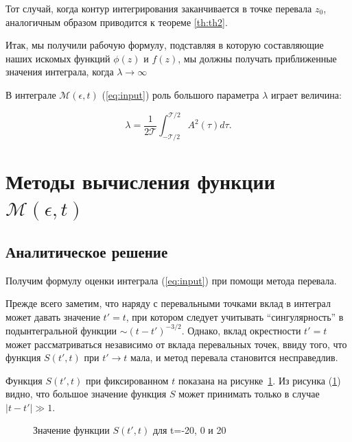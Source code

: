 \documentclass[14pt, a4paper]{article}
\numberwithin{figure}{section}
\numberwithin{equation}{section}
\newcommand{\sectionbreak}{\clearpage}
\newcommand{\cM}{\mathcal{M}}
\newcommand{\cT}{\mathcal{T}}
\begin{document}
Тот случай, когда контур интегрирования заканчивается в точке перевала $z_0$, аналогичным образом приводится к теореме \ref{th:th2}.

Итак, мы получили рабочую формулу, подставляя в которую составляющие наших искомых функций $\phi (z)$ и $f (z)$, мы должны получать приближенные значения интеграла, когда $\lambda \rightarrow \infty$ 

В интеграле $\cM(\epsilon,t)$ (\ref{eq:input}) роль большого параметра $\lambda$ играет величина:

\begin{equation}\label{eq.lambda}
\lambda = \frac{1}{2 \cT} \int_{-\cT/2}^{\cT/2} A^2(\tau) d\tau.
\end{equation}

\sectionbreak
\section{Методы вычисления функции $\cM(\epsilon,t)$}
\subsection{Аналитическое решение}
Получим формулу оценки интеграла (\ref{eq:input}) при помощи метода перевала.

Прежде всего заметим, что наряду с перевальными точками вклад в интеграл может давать значение $t'=t$, при котором следует учитывать ``сингулярность'' в подынтегральной функции $\sim (t-t')^{-3/2}$. Однако, вклад окрестности $t'=t$ может рассматриваться независимо от вклада перевальных точек, ввиду того, что функция $S(t', t)$ при $t'\to t$ мала, и метод перевала становится несправедлив.

Функция $S(t', t)$ при фиксированном $t$ показана на рисунке~\ref{ris:S}.
Из рисунка (\ref{ris:S}) видно, что большое значение функция $S$ может принимать только в случае $|t - t'|\gg 1 $. 

\begin{figure}[h]
	\caption{Значение функции $S(t', t)$ для t=-20, 0 и 20}
	\label{ris:S}
\end{figure}
\end{document}
